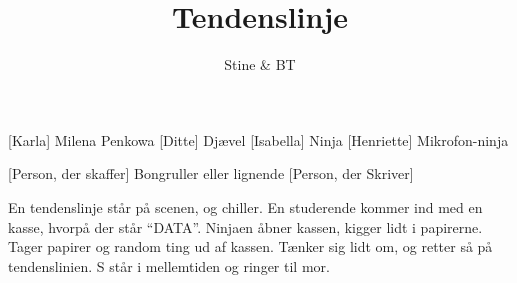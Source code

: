 \documentclass[a4paper,11pt]{article}
\title{Tendenslinje}
\author{Stine \& BT}
\begin{document}
\maketitle

\begin{roles}
    [Karla] Milena Penkowa
    [Ditte] Djævel
    [Isabella] Ninja
    [Henriette] Mikrofon-ninja
\end{roles}

\begin{props}
    [Person, der skaffer] Bongruller eller lignende
     [Person, der Skriver]
\end{props}


\begin{sketch}


\scene En tendenslinje står på scenen, og chiller. En studerende kommer ind med en kasse, hvorpå der står ``DATA''. Ninjaen åbner kassen, kigger lidt i papirerne. Tager papirer og random ting ud af kassen. Tænker sig lidt om, og retter så på tendenslinien. 
\scene S står i mellemtiden og ringer til mor. 


\end{sketch}
\end{document}
